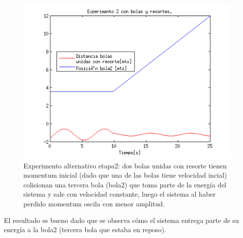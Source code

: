 \documentclass[a4paper,10pt]{article}
\begin{document}
  \begin{figure}[H]
 \centering
 \includegraphics[scale=0.5]{./simulacion_etapa2_experimento2.png}
 \caption{Experimento alternativo etapa2: dos bolas unidas con resorte tienen momentum inicial (dado que una de las bolas tiene velocidad incial) colisionan una tercera bola
 (bola2) que toma parte de la energía del sistema y sale con velocidad constante, luego el sistema al haber perdido momentum oscila con menor amplitud.}
  \label{etapa1.3}
\end{figure}
  
  El resultado es bueno dado que se observa cómo el sistema entrega parte de su energía a la bola2 (tercera bola que estaba en reposo).\newline
  
  
 
\end{document}
